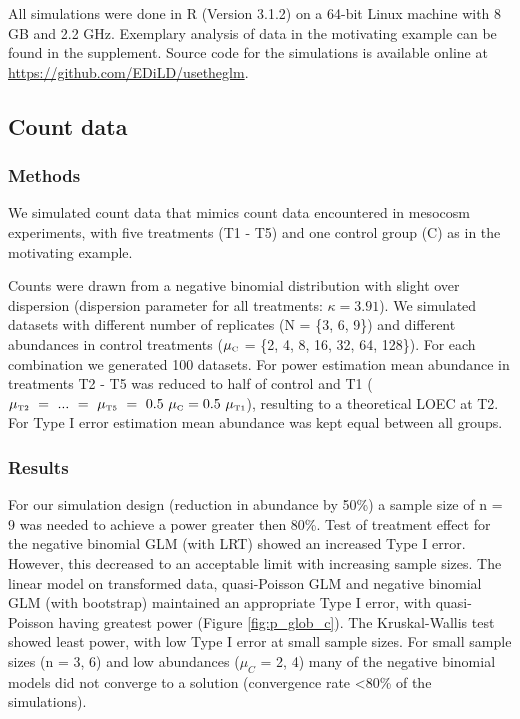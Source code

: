 \documentclass{scrartcl}
\begin{document}
All simulations were done in R (Version 3.1.2) on a 64-bit Linux machine with 8 GB and 2.2 GHz.
Exemplary analysis of data in the motivating example can be found in the supplement.
Source code for the simulations is available online at \url{https://github.com/EDiLD/usetheglm}. 

\subsection{Count data}
\subsubsection{Methods}
We simulated count data that mimics count data encountered in mesocosm experiments, with five treatments (T1 - T5) and one control group (C) as in the motivating example. 

Counts were drawn from a negative binomial distribution with slight over dispersion (dispersion parameter for all treatments: $\kappa = 3.91$).
We simulated datasets with different number of replicates (N = \{3, 6, 9\}) and different abundances in control treatments ($\mu_\text{\tiny C}$ = \{2, 4, 8, 16, 32, 64, 128\}). 
For each combination we generated 100 datasets.
For power estimation mean abundance in treatments T2 - T5 was reduced to half of control and T1 ($\mu_\text{\tiny T2}~=~...~=~\mu_\text{\tiny T5}~=~0.5~\mu_\text{\tiny C} = 0.5~\mu_\text{\tiny T1}$), resulting to a theoretical LOEC at T2.
For Type I error estimation mean abundance was kept equal between all groups.


\subsubsection{Results}
For our simulation design (reduction in abundance by 50\%) a sample size of n = 9 was needed to achieve a power greater then 80\%.
Test of treatment effect for the negative binomial GLM (with LRT) showed an increased Type I error. However, this decreased to an acceptable limit with increasing sample sizes.
The linear model on transformed data, quasi-Poisson GLM and negative binomial GLM (with bootstrap) maintained an appropriate Type I error, with quasi-Poisson having greatest power (Figure \ref{fig:p_glob_c}).
The Kruskal-Wallis test showed least power, with low Type I error at small sample sizes.
For small sample sizes (n = {3, 6}) and low abundances ($\mu_C$ = {2, 4}) many of the negative binomial models did not converge to a solution (convergence rate \textless 80\% of the simulations).
\end{document}
